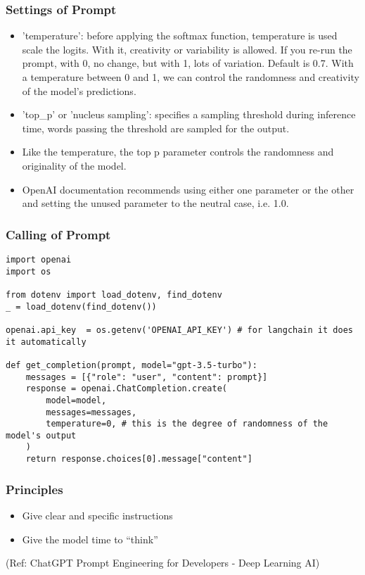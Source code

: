 \begin{frame}[fragile]\frametitle{Settings of Prompt}

\begin{itemize}
\item 'temperature':  before applying the softmax function, temperature is used scale the logits. With it, creativity or variability is allowed. If you re-run the prompt, with 0, no change, but with 1, lots of variation. Default is 0.7. With a temperature between 0 and 1, we can control the randomness and creativity of the model's predictions.
\item 'top\_p' or 'nucleus sampling': specifies a sampling threshold during inference time, words passing the threshold are sampled for the output.
\item Like the temperature, the top p parameter controls the randomness and originality of the model.
\item OpenAI documentation recommends using either one parameter or the other and setting the unused parameter to the neutral case, i.e. 1.0.
\end{itemize}
		
\end{frame}


\begin{frame}[fragile]\frametitle{Calling of Prompt}

\begin{lstlisting}
import openai
import os

from dotenv import load_dotenv, find_dotenv
_ = load_dotenv(find_dotenv())

openai.api_key  = os.getenv('OPENAI_API_KEY') # for langchain it does it automatically

def get_completion(prompt, model="gpt-3.5-turbo"):
    messages = [{"role": "user", "content": prompt}]
    response = openai.ChatCompletion.create(
        model=model,
        messages=messages,
        temperature=0, # this is the degree of randomness of the model's output
    )
    return response.choices[0].message["content"]
\end{lstlisting}
		
\end{frame}

\begin{frame}[fragile]\frametitle{Principles}

\begin{itemize}
\item Give clear and specific instructions
\item Give the model time to “think”
\end{itemize}
		
{\tiny (Ref: ChatGPT Prompt Engineering for Developers - Deep Learning AI)}
		
\end{frame}

